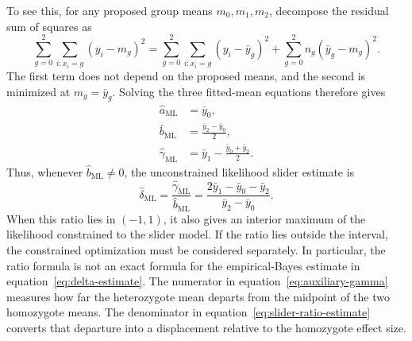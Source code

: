\documentclass[11pt]{article}
\begin{document}
To see this, for any proposed group means $m_0,m_1,m_2$, decompose
the residual sum of squares as
\begin{equation}
\sum_{g=0}^2\sum_{i:x_i=g}(y_i-m_g)^2
=\sum_{g=0}^2\sum_{i:x_i=g}(y_i-\bar y_g)^2
 +\sum_{g=0}^2 n_g(\bar y_g-m_g)^2.
\label{eq:group-rss-decomposition}
\end{equation}
The first term does not depend on the proposed means, and the
second is minimized at $m_g=\bar y_g$. Solving the three fitted-mean
equations therefore gives
\begin{align}
\widehat a_{\mathrm{ML}}&=\bar y_0,\nonumber\\
\widehat b_{\mathrm{ML}}&=\frac{\bar y_2-\bar y_0}{2},
\label{eq:auxiliary-beta}\\
\widehat\gamma_{\mathrm{ML}}
 &=\bar y_1-\frac{\bar y_0+\bar y_2}{2}.
\label{eq:auxiliary-gamma}
\end{align}
Thus, whenever $\widehat b_{\mathrm{ML}}\neq0$, the unconstrained
likelihood slider estimate is
\begin{equation}
\widehat\delta_{\mathrm{ML}}
 =\frac{\widehat\gamma_{\mathrm{ML}}}{\widehat b_{\mathrm{ML}}}
 =\frac{2\bar y_1-\bar y_0-\bar y_2}{\bar y_2-\bar y_0}.
\label{eq:slider-ratio-estimate}
\end{equation}
When this ratio lies in $(-1,1)$, it also gives an interior maximum
of the likelihood constrained to the slider model. If the ratio
lies outside the interval, the constrained optimization must be
considered separately. In particular, the ratio formula is not an
exact formula for the empirical-Bayes estimate in
equation~\eqref{eq:delta-estimate}. The numerator in
equation~\eqref{eq:auxiliary-gamma} measures how far the heterozygote
mean departs from the midpoint of the two homozygote means. The
denominator in equation~\eqref{eq:slider-ratio-estimate} converts
that departure into a displacement relative to the homozygote
effect size.
\end{document}
